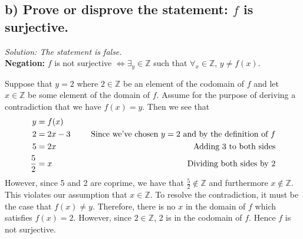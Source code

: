 \documentclass[11pt, letterpaper]{article}
\begin{document}
\subsection*{b) Prove or disprove the statement: $f$ is surjective.}
{\large\it Solution: The statement is false.}\\[0.25cm]
{\bf Negation:} $f$ is not surjective $\iff \exists_{y}\in\mathbb{Z}$ such that $\forall_{x}\in\mathbb{Z}$, $y\neq f(x)$.
\begin{prf}
    Suppose that $y=2$ where $2\in\mathbb{Z}$ be an element of the codomain of $f$ and let $x\in\mathbb{Z}$ be some element of the domain of $f$.
    Assume for the purpose of deriving a contradiction that we have $f(x)=y$. Then we see that
    \begin{align*}
        y&=f(x)\\
        2&=2x-3 &\text{\indent Since we've chosen $y=2$ and by the definition of $f$}\\
        5&=2x &\text{\indent Adding 3 to both sides}\\
        \frac{5}{2}&=x&\text{\indent Dividing both sides by 2}
    \end{align*}
    However, since 5 and 2 are coprime, we have that $\frac{5}{2}\notin \mathbb{Z}$ and furthermore $x\notin\mathbb{Z}$. This violates our assumption that $x\in\mathbb{Z}$. 
    To resolve the contradiction, it must be the case that $f(x)\neq y$. Therefore, there is no $x$ in the domain of $f$ which satisfies $f(x)=2$. However, since $2\in\mathbb{Z}$, 2 is in the codomain of $f$. Hence $f$ is not surjective.
\end{prf}
\end{document}
